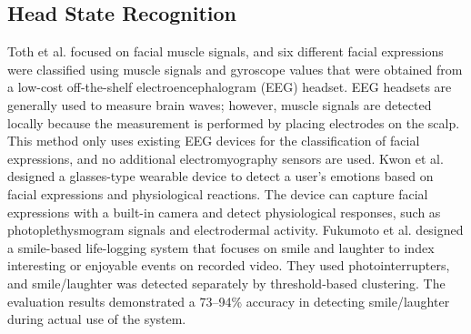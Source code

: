 \documentclass[sigchi,authordraft]{acmart}
\begin{document}



\subsection{Head State Recognition}
Toth et al. \cite{facial_expression_headset} focused on facial muscle signals, and six different facial expressions were classified using muscle signals and gyroscope values that were obtained from a low-cost off-the-shelf electroencephalogram (EEG) headset. EEG headsets are generally used to measure brain waves; however, muscle signals are detected locally because the measurement is performed by placing electrodes on the scalp. This method only uses existing EEG devices for the classification of facial expressions, and no additional electromyography sensors are used. Kwon et al. \cite{facial_expression_glasses} designed a glasses-type wearable device to detect a user's emotions based on facial expressions and physiological reactions. The device can capture facial expressions with a built-in camera and detect physiological responses, such as photoplethysmogram signals and electrodermal activity. Fukumoto et al. \cite{fukumoto} designed a smile-based life-logging system that focuses on smile and laughter to index interesting or enjoyable events on recorded video. They used photointerrupters, and smile/laughter was detected separately by threshold-based clustering. The evaluation results demonstrated a 73–94\% accuracy in detecting smile/laughter during actual use of the system.\par
\end{document}
